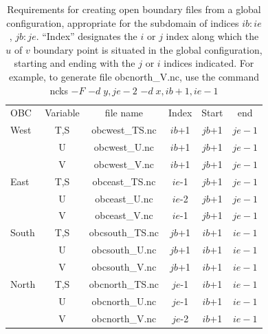 \begin{table}[htbp]     \begin{center}      \begin{tabular}{|l|c|c|c|c|c|}
\hline
OBC  & Variable   & file name      & Index  & Start  & end  \\
West &  T,S       &   obcwest\_TS.nc &  $ib$+1     &   $jb$+1 &  $je-1$  \\
     &    U       &   obcwest\_U.nc  &  $ib$+1     &   $jb$+1 &  $je-1$  \\ 
     &    V       &   obcwest\_V.nc  &  $ib$+1     &   $jb$+1 &  $je-1$  \\       
\hline
East &  T,S       &   obceast\_TS.nc &  $ie$-1     &   $jb$+1 &  $je-1$  \\
     &    U       &   obceast\_U.nc  &  $ie$-2     &   $jb$+1 &  $je-1$  \\ 
     &    V       &   obceast\_V.nc  &  $ie$-1     &   $jb$+1 &  $je-1$  \\       
\hline         
South &  T,S      &   obcsouth\_TS.nc &  $jb$+1     &  $ib$+1 &  $ie-1$  \\
      &    U      &   obcsouth\_U.nc  &  $jb$+1     &  $ib$+1 &  $ie-1$  \\ 
      &    V      &   obcsouth\_V.nc  &  $jb$+1     &  $ib$+1 &  $ie-1$  \\    
\hline
North &  T,S      &   obcnorth\_TS.nc &  $je$-1     &  $ib$+1 &  $ie-1$  \\
      &    U      &   obcnorth\_U.nc  &  $je$-1     &  $ib$+1 &  $ie-1$  \\ 
      &    V      &   obcnorth\_V.nc  &  $je$-2     &  $ib$+1 &  $ie-1$  \\  
\hline
\end{tabular}     \end{center}
\caption{    \label{Tab_obc_ind}
Requirements for creating open boundary files from a global configuration, 
appropriate for the subdomain of indices $ib:ie$, $jb:je$. ``Index'' designates the 
$i$ or $j$ index along which the $u$ of $v$ boundary point is situated in the global 
configuration, starting and ending with the $j$ or $i$ indices indicated. 
For example, to generate file obcnorth\_V.nc, use the command ncks 
$-F$ $-d\;y,je-2$  $-d\;x,ib+1,ie-1$ } 
\end{table}

